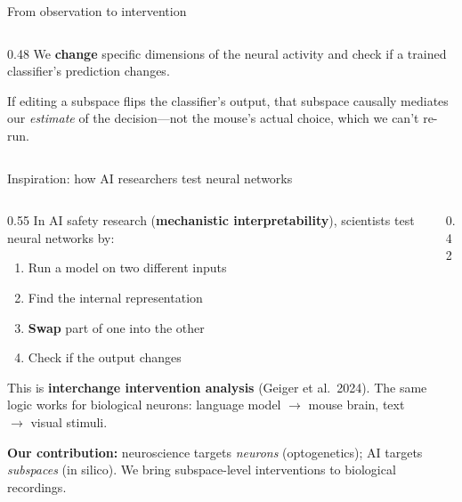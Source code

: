 \documentclass[aspectratio=169,11pt]{beamer}
\begin{document}
\begin{frame}{From observation to intervention}
\begin{columns}[T]
\begin{column}{0.48\textwidth}
\vspace{0.5em}
{\small We \textbf{change} specific dimensions of the neural activity and check if a trained classifier's prediction changes.}

\vspace{0.5em}
{\small If editing a subspace flips the classifier's output, that subspace causally mediates our \emph{estimate} of the decision---not the mouse's actual choice, which we can't re-run.}
\end{column}
\end{columns}
\end{frame}

\begin{frame}{Inspiration: how AI researchers test neural networks}
\begin{columns}[T]
\begin{column}{0.55\textwidth}
{\small In AI safety research (\textbf{mechanistic interpretability}), scientists test neural networks by:}

\begin{enumerate}\setlength\itemsep{0pt}
  \item {\small Run a model on two different inputs}
  \item {\small Find the internal representation}
  \item {\small \textbf{Swap} part of one into the other}
  \item {\small Check if the output changes}
\end{enumerate}

\vspace{0.1em}
{\small This is \textbf{interchange intervention analysis} (Geiger et al.\ 2024). The same logic works for biological neurons: language model $\to$ mouse brain, text $\to$ visual stimuli.}

\vspace{0.2em}
{\scriptsize \textbf{Our contribution:} neuroscience targets \emph{neurons} (optogenetics); AI targets \emph{subspaces} (in silico). We bring subspace-level interventions to biological recordings.}
\end{column}
\begin{column}{0.42\textwidth}
\centering
{}
\end{column}
\end{columns}
\end{frame}
\end{document}
